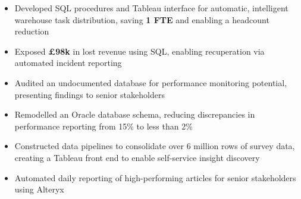 \begin{paracol}{2}
\begin{itemize}

\medskip
{}

\end{itemize}

\divider

\begin{itemize}
\item Developed SQL procedures and Tableau interface for automatic, intelligent warehouse task distribution, saving \textbf{1 FTE} and enabling a headcount reduction
\item Exposed \textbf{£98k} in lost revenue using SQL, enabling recuperation via automated incident reporting
\item Audited an undocumented database for performance monitoring potential, presenting findings to senior stakeholders
\item Remodelled an Oracle database schema, reducing discrepancies in performance reporting from 15\% to less than 2\%

\medskip
{}

\end{itemize}

\divider

\begin{itemize}
\item Constructed data pipelines to consolidate over 6 million rows of survey data, creating a Tableau front end to enable self-service insight discovery
\item Automated daily reporting of high-performing articles for senior stakeholders using Alteryx


\end{itemize}
\end{paracol}
